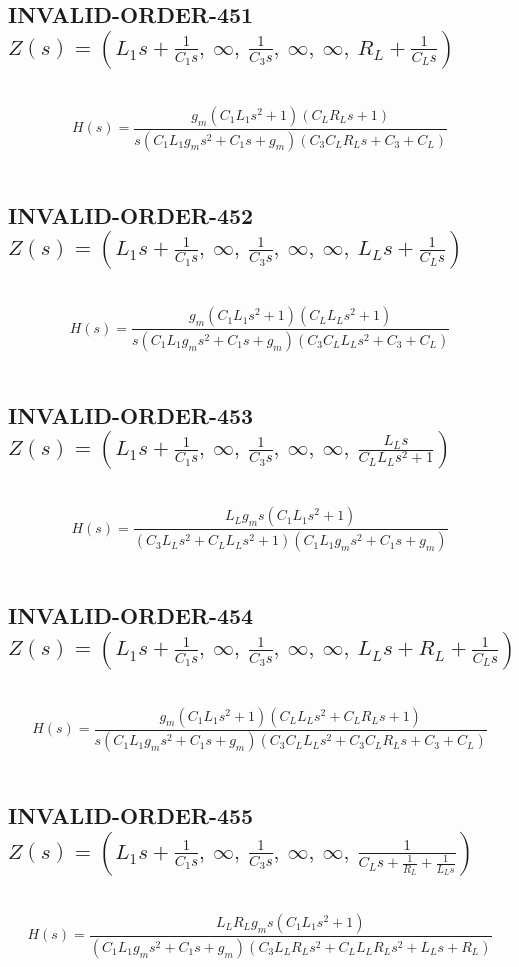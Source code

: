 \documentclass{article}
\begin{document}
\subsection{INVALID-ORDER-451 $Z(s) = \left( L_{1} s + \frac{1}{C_{1} s}, \  \infty, \  \frac{1}{C_{3} s}, \  \infty, \  \infty, \  R_{L} + \frac{1}{C_{L} s}\right)$ } \ 
\textbf{\[H(s) = \frac{g_{m} \left(C_{1} L_{1} s^{2} + 1\right) \left(C_{L} R_{L} s + 1\right)}{s \left(C_{1} L_{1} g_{m} s^{2} + C_{1} s + g_{m}\right) \left(C_{3} C_{L} R_{L} s + C_{3} + C_{L}\right)}\] } \ 
\subsection{INVALID-ORDER-452 $Z(s) = \left( L_{1} s + \frac{1}{C_{1} s}, \  \infty, \  \frac{1}{C_{3} s}, \  \infty, \  \infty, \  L_{L} s + \frac{1}{C_{L} s}\right)$ } \ 
\textbf{\[H(s) = \frac{g_{m} \left(C_{1} L_{1} s^{2} + 1\right) \left(C_{L} L_{L} s^{2} + 1\right)}{s \left(C_{1} L_{1} g_{m} s^{2} + C_{1} s + g_{m}\right) \left(C_{3} C_{L} L_{L} s^{2} + C_{3} + C_{L}\right)}\] } \ 
\subsection{INVALID-ORDER-453 $Z(s) = \left( L_{1} s + \frac{1}{C_{1} s}, \  \infty, \  \frac{1}{C_{3} s}, \  \infty, \  \infty, \  \frac{L_{L} s}{C_{L} L_{L} s^{2} + 1}\right)$ } \ 
\textbf{\[H(s) = \frac{L_{L} g_{m} s \left(C_{1} L_{1} s^{2} + 1\right)}{\left(C_{3} L_{L} s^{2} + C_{L} L_{L} s^{2} + 1\right) \left(C_{1} L_{1} g_{m} s^{2} + C_{1} s + g_{m}\right)}\] } \ 
\subsection{INVALID-ORDER-454 $Z(s) = \left( L_{1} s + \frac{1}{C_{1} s}, \  \infty, \  \frac{1}{C_{3} s}, \  \infty, \  \infty, \  L_{L} s + R_{L} + \frac{1}{C_{L} s}\right)$ } \ 
\textbf{\[H(s) = \frac{g_{m} \left(C_{1} L_{1} s^{2} + 1\right) \left(C_{L} L_{L} s^{2} + C_{L} R_{L} s + 1\right)}{s \left(C_{1} L_{1} g_{m} s^{2} + C_{1} s + g_{m}\right) \left(C_{3} C_{L} L_{L} s^{2} + C_{3} C_{L} R_{L} s + C_{3} + C_{L}\right)}\] } \ 
\subsection{INVALID-ORDER-455 $Z(s) = \left( L_{1} s + \frac{1}{C_{1} s}, \  \infty, \  \frac{1}{C_{3} s}, \  \infty, \  \infty, \  \frac{1}{C_{L} s + \frac{1}{R_{L}} + \frac{1}{L_{L} s}}\right)$ } \ 
\textbf{\[H(s) = \frac{L_{L} R_{L} g_{m} s \left(C_{1} L_{1} s^{2} + 1\right)}{\left(C_{1} L_{1} g_{m} s^{2} + C_{1} s + g_{m}\right) \left(C_{3} L_{L} R_{L} s^{2} + C_{L} L_{L} R_{L} s^{2} + L_{L} s + R_{L}\right)}\] } \ 
\end{document}
